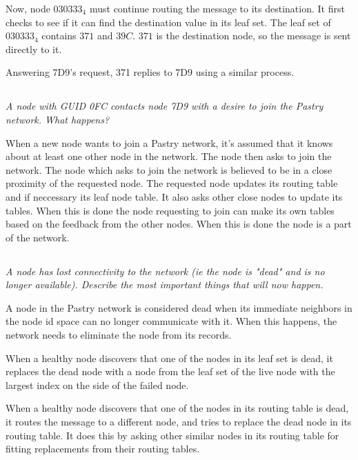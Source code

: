 \documentclass{article}
\newcommand{\question}[1]{\subsection{}\textit{#1}\bigskip}
\begin{document}
Now, node $ 030333_4 $ must continue routing the message to its destination.
It first checks to see if it can find the destination value in its leaf set.
The leaf set of $ 030333_4 $ contains $ 371 $ and $ 39C $.
$ 371 $ is the destination node, so the message is sent directly to it.

Answering 7D9's request, 371 replies to 7D9 using a similar process.


\question{A node with GUID 0FC contacts node 7D9 with a desire to join the Pastry network. What happens?}

When a new node wants to join a Pastry network, it's assumed that it knows about at least one other node in the network. The node then asks to join the network.
The node which asks to join the network is believed to be in a close proximity of the requested node.
The requested node updates its routing table and if neccessary its leaf node table. It also asks other close nodes to update its tables.
When this is done the node requesting to join can make its own tables based on the feedback from the other nodes.
When this is done the node is a part of the network.

\question{A node has lost connectivity to the network (ie the node is "dead" and is no longer available). Describe the most important things that will now happen.}

A node in the Pastry network is considered dead when its immediate neighbors in the node id space can no longer communicate with it.
When this happens, the network needs to eliminate the node from its records.

When a healthy node discovers that one of the nodes in its leaf set is dead, it replaces the dead node with a node from the leaf set of the live node with the largest index on the side of the failed node.

When a healthy node discovers that one of the nodes in its routing table is dead, it routes the message to a different node, and tries to replace the dead node in its routing table.
It does this by asking other similar nodes in its routing table for fitting replacements from their routing tables.
\end{document}
